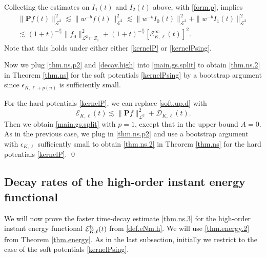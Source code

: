 \documentclass{amsart}
\numberwithin{equation}{section}
\begin{document}
Collecting the estimates on $I_1(t)$ and $I_2(t)$ above, with \eqref{form.p}, implies 
\begin{multline}
\|{\mathbf{P}} {f}(t)\|_{{\mathcal{L}}^2}^2\lesssim\|w^{-{b}}{f}(t)\|_{{\mathcal{L}}^2}^2\lesssim
\|w^{-{b}} I_0(t)\|_{{\mathcal{L}}^2}^2
+
\|w^{-{b}} I_1(t)\|_{{\mathcal{L}}^2}^2
\\
\lesssim
(1+t)^{-\frac{n}{2}} \|{f}_0\|_{{\mathcal{L}}^2\cap Z_1}^2
+
 (1+t)^{-\frac{n}{2}}[{\mathcal{E}}_{{K},{\ell}}^\infty(t)]^2.\label{thm.ns.p2}
\end{multline}
Note that this holds under either either \eqref{kernelP} or \eqref{kernelPsing}.  

Now we plug \eqref{thm.ns.p2} and
\eqref{decay.high} 
into 
\eqref{main.gs.split} to obtain \eqref{thm.ns.2} in Theorem \ref{thm.ns} for the soft potentials \eqref{kernelPsing}
by a bootstrap argument since ${\epsilon}_{{K},{\ell}+{p({n})}}$ is sufficiently small.  

For the hard potentials \eqref{kernelP}, 
we can replace \eqref{soft.up.d} with 
$$
{\mathcal{E}}_{{K},{\ell}}(t) \lesssim \|{\mathbf{P}} {f}\|_{{\mathcal{L}}^2}^2+  {\mathcal{D}}_{{K},{\ell}}(t).
$$
Then we obtain \eqref{main.gs.split} 
with $p=1$, except that in the upper bound ${A} =0$.
As in the previous case, we plug in \eqref{thm.ns.p2}
and use a bootstrap argument with ${\epsilon}_{{K},{\ell}}$ sufficiently small
to obtain \eqref{thm.ns.2} in Theorem \ref{thm.ns} for the hard potentials  \eqref{kernelP}.
 \qed

\subsection{Decay rates of the high-order instant energy functional}\label{sec.decayNL.2} We will now prove the faster time-decay estimate \eqref{thm.ns.3} for the high-order instant energy functional ${\mathcal{E}}_{{K},{\ell}}^{\rm h}(t)$ from \eqref{def.eNm.h}. We will use \eqref{thm.energy.2} from Theorem \ref{thm.energy}.  As in the last subsection, initially we restrict to the case of the soft potentials \eqref{kernelPsing}.  
\end{document}
